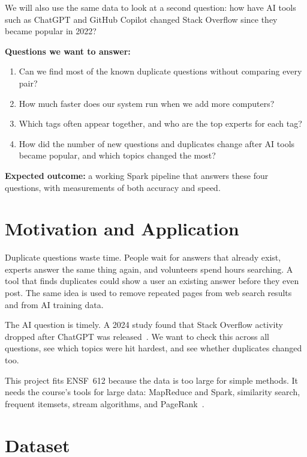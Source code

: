 \documentclass[11pt,a4paper]{article}
\begin{document}
We will also use the same data to look at a second question: how have AI tools
such as ChatGPT and GitHub Copilot changed Stack Overflow since they became
popular in 2022?

\textbf{Questions we want to answer:}
\begin{enumerate}[label=\textbf{Q\arabic*.},leftmargin=2.2em]
  \item Can we find most of the known duplicate questions without comparing
        every pair?
  \item How much faster does our system run when we add more computers?
  \item Which tags often appear together, and who are the top experts for each
        tag?
  \item How did the number of new questions and duplicates change after AI tools
        became popular, and which topics changed the most?
\end{enumerate}

\textbf{Expected outcome:} a working Spark pipeline that answers these four
questions, with measurements of both accuracy and speed.

\section{Motivation and Application}

Duplicate questions waste time. People wait for answers that already exist,
experts answer the same thing again, and volunteers spend hours searching. A
tool that finds duplicates could show a user an existing answer before they
even post. The same idea is used to remove repeated pages from web search
results and from AI training data.

The AI question is timely. A 2024 study found that Stack Overflow activity
dropped after ChatGPT was released~\cite{delrio2024}. We want to check this across all
questions, see which topics were hit hardest, and see whether duplicates
changed too.

This project fits ENSF~612 because the data is too large for simple methods.
It needs the course's tools for large data: MapReduce and Spark, similarity
search, frequent itemsets, stream algorithms, and PageRank~\cite{mmds}.

\section{Dataset}
\end{document}
